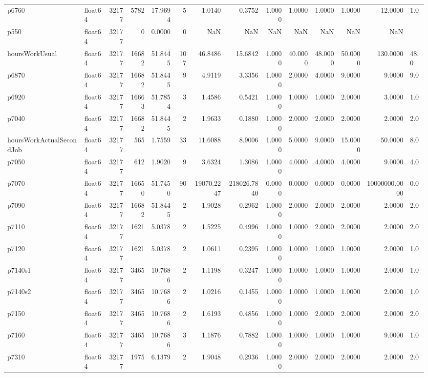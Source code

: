 \begin{longtable}{llrrrrrrrrrrrl}
p6760 & float64 & 32177 & 5782 & 17.9694 & 5 & 1.0140 & 0.3752 & 1.0000 & 1.0000 & 1.0000 & 1.0000 & 12.0000 & 1.0 \\
p550 & float64 & 32177 & 0 & 0.0000 & 0 & NaN & NaN & NaN & NaN & NaN & NaN & NaN &  \\
hoursWorkUsual & float64 & 32177 & 16682 & 51.8445 & 107 & 46.8486 & 15.6842 & 1.0000 & 40.0000 & 48.0000 & 50.0000 & 130.0000 & 48.0 \\
p6870 & float64 & 32177 & 16682 & 51.8445 & 9 & 4.9119 & 3.3356 & 1.0000 & 2.0000 & 4.0000 & 9.0000 & 9.0000 & 9.0 \\
p6920 & float64 & 32177 & 16663 & 51.7854 & 3 & 1.4586 & 0.5421 & 1.0000 & 1.0000 & 1.0000 & 2.0000 & 3.0000 & 1.0 \\
p7040 & float64 & 32177 & 16682 & 51.8445 & 2 & 1.9633 & 0.1880 & 1.0000 & 2.0000 & 2.0000 & 2.0000 & 2.0000 & 2.0 \\
hoursWorkActualSecondJob & float64 & 32177 & 565 & 1.7559 & 33 & 11.6088 & 8.9006 & 1.0000 & 5.0000 & 9.0000 & 15.0000 & 50.0000 & 8.0 \\
p7050 & float64 & 32177 & 612 & 1.9020 & 9 & 3.6324 & 1.3086 & 1.0000 & 4.0000 & 4.0000 & 4.0000 & 9.0000 & 4.0 \\
p7070 & float64 & 32177 & 16650 & 51.7450 & 90 & 19070.2247 & 218026.7840 & 0.0000 & 0.0000 & 0.0000 & 0.0000 & 10000000.0000 & 0.0 \\
p7090 & float64 & 32177 & 16682 & 51.8445 & 2 & 1.9028 & 0.2962 & 1.0000 & 2.0000 & 2.0000 & 2.0000 & 2.0000 & 2.0 \\
p7110 & float64 & 32177 & 1621 & 5.0378 & 2 & 1.5225 & 0.4996 & 1.0000 & 1.0000 & 2.0000 & 2.0000 & 2.0000 & 2.0 \\
p7120 & float64 & 32177 & 1621 & 5.0378 & 2 & 1.0611 & 0.2395 & 1.0000 & 1.0000 & 1.0000 & 1.0000 & 2.0000 & 1.0 \\
p7140s1 & float64 & 32177 & 3465 & 10.7686 & 2 & 1.1198 & 0.3247 & 1.0000 & 1.0000 & 1.0000 & 1.0000 & 2.0000 & 1.0 \\
p7140s2 & float64 & 32177 & 3465 & 10.7686 & 2 & 1.0216 & 0.1455 & 1.0000 & 1.0000 & 1.0000 & 1.0000 & 2.0000 & 1.0 \\
p7150 & float64 & 32177 & 3465 & 10.7686 & 2 & 1.6193 & 0.4856 & 1.0000 & 1.0000 & 2.0000 & 2.0000 & 2.0000 & 2.0 \\
p7160 & float64 & 32177 & 3465 & 10.7686 & 3 & 1.1876 & 0.7882 & 1.0000 & 1.0000 & 1.0000 & 1.0000 & 9.0000 & 1.0 \\
p7310 & float64 & 32177 & 1975 & 6.1379 & 2 & 1.9048 & 0.2936 & 1.0000 & 2.0000 & 2.0000 & 2.0000 & 2.0000 & 2.0 \\

\end{longtable}
